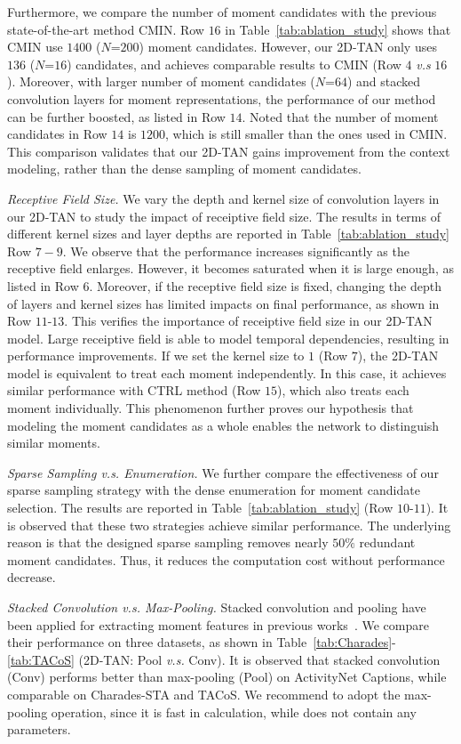 \documentclass[letterpaper]{article} %
\begin{document}
Furthermore, we compare the number of moment candidates with the previous state-of-the-art method CMIN.
Row $16$ in Table~\ref{tab:ablation_study} shows that CMIN use $1400$ ($N$=$200$) moment candidates. However, our 2D-TAN only uses $136$ ($N$=$16$) candidates, and achieves comparable results to CMIN (Row $4$ \emph{v.s} $16$ ).
Moreover, with larger number of moment candidates ($N$=$64$) and stacked convolution layers for moment representations, the performance of our method can be further boosted, as listed in Row $14$.
Noted that the number of moment candidates in Row $14$ is $1200$, which is still smaller than the ones used in CMIN.
This comparison validates that our 2D-TAN gains improvement from the context modeling, rather than the dense sampling of moment candidates.

\textit{Receptive Field Size. } We vary the depth and kernel size of convolution layers in our 2D-TAN to study the impact of receiptive field size.  
The results in terms of different kernel sizes and layer depths are reported in Table~\ref{tab:ablation_study} Row $7-9$. 
We observe that the performance increases significantly as the receptive field enlarges.
However, it becomes saturated when it is large enough, as listed in Row $6$.
Moreover, if the receptive field size is fixed, changing the depth of layers and kernel sizes has limited impacts on final performance, as shown in Row $11$-$13$. 
This verifies the importance of receiptive field size in our 2D-TAN model. Large receiptive field is able to model temporal dependencies, resulting in performance improvements.
If we set the kernel size to $1$ (Row $7$), the 2D-TAN model is equivalent to treat each moment independently. In this case, it achieves similar performance with CTRL method (Row $15$), which also treats each moment individually. 
This phenomenon further proves our hypothesis that modeling the moment candidates as a whole enables the network to distinguish similar moments.

\textit{Sparse Sampling \emph{v.s.} Enumeration.}
We further compare the effectiveness of our sparse sampling strategy with the dense enumeration for moment candidate selection. The results are reported in Table~\ref{tab:ablation_study} (Row $10$-$11$). It is observed that these two strategies achieve similar performance. The underlying reason is that the designed sparse sampling removes nearly $50\%$ redundant moment candidates. Thus, it reduces the computation cost without performance decrease.

 \textit{Stacked Convolution \emph{v.s.} Max-Pooling.} 
Stacked convolution and pooling have been applied for extracting moment features in previous works~\cite{hendricks17iccv,zhang2019man}.
We compare their performance on three datasets, as  shown in Table~\ref{tab:Charades}-\ref{tab:TACoS} (2D-TAN: Pool \emph{v.s.} Conv).
It is observed that stacked convolution (Conv) performs better than max-pooling (Pool) on ActivityNet Captions, while comparable on Charades-STA and TACoS. We recommend to adopt the max-pooling operation, since it is fast in calculation, while does not contain any parameters.
\end{document}

